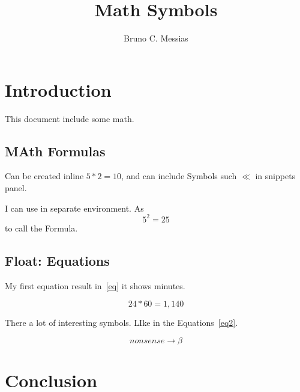 \documentclass{article}
\title{Math Symbols}
\author{Bruno C. Messias}
\date{}
\begin{document}
\maketitle

\section{Introduction}

This document include some math.

\subsection{MAth Formulas}

Can be created inline $5*2=10$, and can include Symbols such $\ll $ in snippets panel.

I can use in separate environment. As \[5^2 = 25\] to call the Formula.

\subsection{Float: Equations}

My first equation result in~\ref{eq} it shows minutes.

\begin{equation}
    24*60 = 1,140
    \label{eq}
\end{equation}


There a lot of interesting symbols. LIke in the Equations~\ref{eq2}.

\begin{equation}
    non sense \rightarrow \beta 
    \label{eq2}
\end{equation}

\subsection{}


\section{Conclusion}
\end{document}
